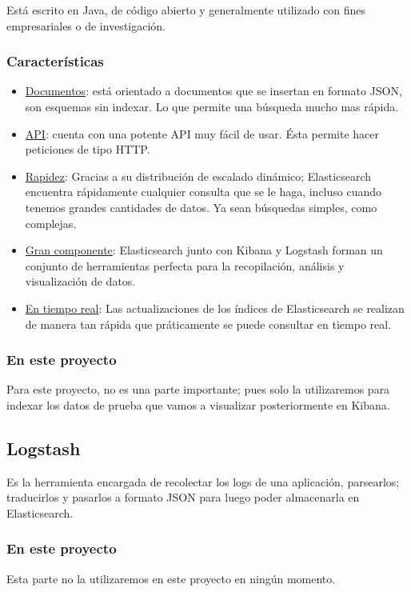 \documentclass[a4paper, 12pt]{book}
\begin{document}
Está escrito en Java, de código abierto y generalmente utilizado con fines empresariales o de investigación.
\subsubsection{Características}
\begin{itemize}
\item \underline{Documentos}: está orientado a documentos que se insertan en formato JSON, son esquemas sin indexar. Lo que permite una búsqueda mucho mas rápida.
\item \underline{API}: cuenta con una potente API muy fácil de usar. Ésta permite hacer peticiones de tipo HTTP.
\item \underline{Rapidez}: Gracias a su distribución de escalado dinámico; Elasticsearch encuentra rápidamente cualquier consulta que se le haga, incluso cuando tenemos grandes cantidades de datos. Ya sean búsquedas simples, como complejas.
\item \underline{Gran componente}: Elasticsearch junto con Kibana y Logstash forman un conjunto de herramientas perfecta para la recopilación, análisis y visualización de datos.
\item \underline{En tiempo real}: Las actualizaciones de los índices de Elasticsearch se realizan de manera tan rápida que práticamente se puede consultar en tiempo real.
\end{itemize}
\subsubsection{En este proyecto}
Para este proyecto, no es una parte importante; pues solo la utilizaremos para indexar los datos de prueba que vamos a visualizar posteriormente en Kibana.


\subsection{Logstash}
Es la herramienta encargada de recolectar los logs de una aplicación, parsearlos; traducirlos y pasarlos a formato JSON para luego poder almacenarla en Elasticsearch. 

\subsubsection{En este proyecto}
Esta parte no la utilizaremos en este proyecto en ningún momento.

\end{document}
